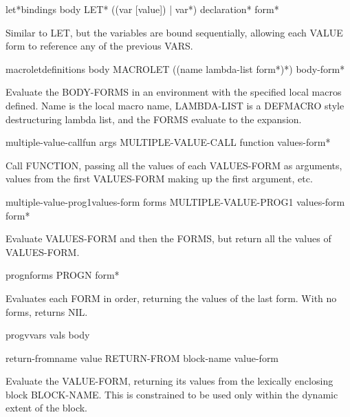 \begin{specialop}{let*}{bindings \body body}{}{}
  LET* ({(var [value]) | var}*) declaration* form*

Similar to LET, but the variables are bound sequentially, allowing each VALUE
form to reference any of the previous VARS.
\end{specialop}

\begin{specialop}{macrolet}{definitions \rest body}{}{}
  MACROLET ({(name lambda-list form*)}*) body-form*

Evaluate the BODY-FORMS in an environment with the specified local macros
defined. Name is the local macro name, LAMBDA-LIST is a DEFMACRO style
destructuring lambda list, and the FORMS evaluate to the expansion.
\end{specialop}

\begin{specialop}{multiple-value-call}{fun \rest args}{}{}
  MULTIPLE-VALUE-CALL function values-form*

Call FUNCTION, passing all the values of each VALUES-FORM as arguments,
values from the first VALUES-FORM making up the first argument, etc.
\end{specialop}

\begin{specialop}{multiple-value-prog1}{values-form \rest forms}{}{}
  MULTIPLE-VALUE-PROG1 values-form form*

Evaluate VALUES-FORM and then the FORMS, but return all the values of
VALUES-FORM.
\end{specialop}

\begin{specialop}{progn}{\rest forms}{}{}
  PROGN form*

Evaluates each FORM in order, returning the values of the last form. With no
forms, returns NIL.
\end{specialop}

\begin{specialop}{progv}{vars vals \body body}{}{}
  
\end{specialop}

\begin{specialop}{return-from}{name \op value}{}{}
  RETURN-FROM block-name value-form

Evaluate the VALUE-FORM, returning its values from the lexically enclosing
block BLOCK-NAME. This is constrained to be used only within the dynamic
extent of the block.
\end{specialop}

